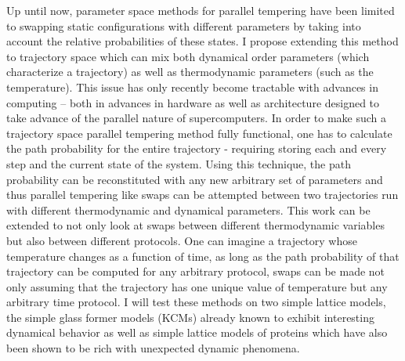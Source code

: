 \documentclass[11pt]{article}
\newcommand{\kB}{k_{\mathrm{B}}}
\begin{document}
Up until now, parameter space methods for parallel tempering %
have been limited to swapping static configurations with different parameters by taking into account the relative probabilities of these states.  I propose extending this method to trajectory space which can mix both dynamical order parameters (which characterize a trajectory) as well as thermodynamic parameters (such as the temperature).  This issue has only recently become tractable with advances in computing -- both in advances in hardware as well as architecture designed to take advance of the parallel nature of supercomputers.  In order to make such a trajectory space parallel tempering method fully functional, one has to calculate the path probability for the entire trajectory - requiring storing each and every step and the current state of the system.  Using this technique, the path probability can be reconstituted with any new arbitrary set of parameters and thus parallel tempering like swaps can be attempted between two trajectories run with different thermodynamic and dynamical parameters.  This work can be extended to not only look at swaps between different thermodynamic variables but also between different protocols.  One can imagine a trajectory whose temperature changes as a function of time, as long as the path probability of that trajectory can be computed for any arbitrary protocol, swaps can be made not only assuming that the trajectory has one unique value of temperature but any arbitrary time protocol.  I will test these methods on two simple lattice models, the simple glass former models (KCMs) already known to exhibit interesting dynamical behavior as well as simple lattice models of proteins which have also been shown to be rich with unexpected dynamic phenomena.  

\end{document}
